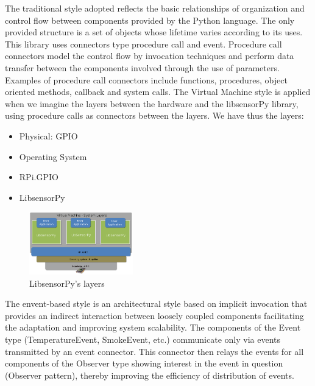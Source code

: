 \documentclass{acm_proc_article-sp}
\begin{document}
The traditional style adopted reflects the basic relationships of organization and control flow between components provided by the Python language. The only provided structure is a set of objects whose lifetime varies according to its uses. This library uses connectors type procedure call and event. Procedure call connectors model the control flow by invocation techniques and perform data transfer between the components involved through the use of parameters. Examples of procedure call connectors include functions, procedures,  object oriented methods, callback and system calls.
\newline
\newline
The Virtual Machine style is applied when we imagine the layers between the hardware and the libsensorPy library, using procedure calls as connectors between the layers. We have thus the layers:
\begin{itemize}
\item Physical: GPIO
\item Operating System
\item RPi.GPIO
\item LibsensorPy
\end{itemize}

\begin{figure}[h]
    \includegraphics[width=0.4\textwidth,natwidth=610,natheight=642]{pictures/machinelayers.png}
    \caption{LibsensorPy's layers}
    \label{fig:layers}
\end{figure}

The envent-based style is an architectural style based on implicit invocation that provides an indirect interaction between loosely coupled components facilitating the adaptation and improving system scalability. The components of the Event type (TemperatureEvent, SmokeEvent, etc.) communicate only via events transmitted by an event connector. This connector then relays the events for all components of the Observer type showing interest in the event in question (Observer pattern), thereby improving the efficiency of distribution of events.
\end{document}
